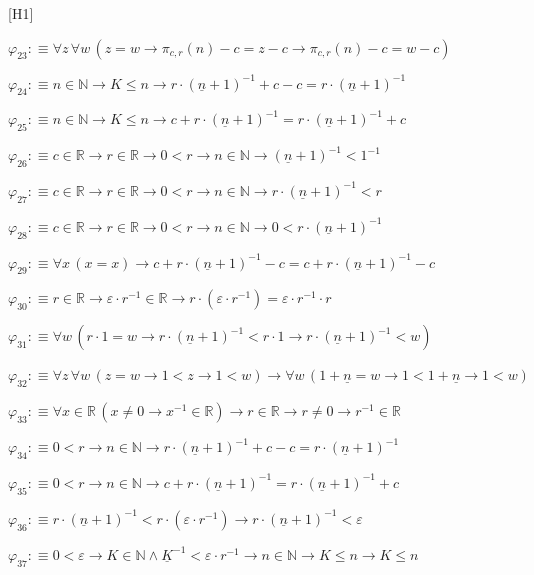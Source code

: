 \begin{fullproof}{[H1]}
\begin{abbrevlist}
\item $\varphi_{23} :\equiv \forall z\,\forall w\,(z = w \to \pi_{c,r}(n) - c = z - c \to \pi_{c,r}(n) - c = w - c)$
\item $\varphi_{24} :\equiv n \in \mathbb{N} \to K \leq n \to r \cdot (\underline{n} + 1)^{-1} + c - c = r \cdot (\underline{n} + 1)^{-1}$
\item $\varphi_{25} :\equiv n \in \mathbb{N} \to K \leq n \to c + r \cdot (\underline{n} + 1)^{-1} = r \cdot (\underline{n} + 1)^{-1} + c$
\item $\varphi_{26} :\equiv c \in \mathbb{R} \to r \in \mathbb{R} \to 0 < r \to n \in \mathbb{N} \to (\underline{n} + 1)^{-1} < 1^{-1}$
\item $\varphi_{27} :\equiv c \in \mathbb{R} \to r \in \mathbb{R} \to 0 < r \to n \in \mathbb{N} \to r \cdot (\underline{n} + 1)^{-1} < r$
\item $\varphi_{28} :\equiv c \in \mathbb{R} \to r \in \mathbb{R} \to 0 < r \to n \in \mathbb{N} \to 0 < r \cdot (\underline{n} + 1)^{-1}$
\item $\varphi_{29} :\equiv \forall x\,(x = x) \to c + r \cdot (\underline{n} + 1)^{-1} - c = c + r \cdot (\underline{n} + 1)^{-1} - c$
\item $\varphi_{30} :\equiv r \in \mathbb{R} \to \varepsilon \cdot r^{-1} \in \mathbb{R} \to r \cdot (\varepsilon \cdot r^{-1}) = \varepsilon \cdot r^{-1} \cdot r$
\item $\varphi_{31} :\equiv \forall w\,(r \cdot 1 = w \to r \cdot (\underline{n} + 1)^{-1} < r \cdot 1 \to r \cdot (\underline{n} + 1)^{-1} < w)$
\item $\varphi_{32} :\equiv \forall z\,\forall w\,(z = w \to 1 < z \to 1 < w) \to \forall w\,(1 + \underline{n} = w \to 1 < 1 + \underline{n} \to 1 < w)$
\item $\varphi_{33} :\equiv \forall x \in \mathbb{R}\,(x \neq 0 \to x^{-1} \in \mathbb{R}) \to r \in \mathbb{R} \to r \neq 0 \to r^{-1} \in \mathbb{R}$
\item $\varphi_{34} :\equiv 0 < r \to n \in \mathbb{N} \to r \cdot (\underline{n} + 1)^{-1} + c - c = r \cdot (\underline{n} + 1)^{-1}$
\item $\varphi_{35} :\equiv 0 < r \to n \in \mathbb{N} \to c + r \cdot (\underline{n} + 1)^{-1} = r \cdot (\underline{n} + 1)^{-1} + c$
\item $\varphi_{36} :\equiv r \cdot (\underline{n} + 1)^{-1} < r \cdot (\varepsilon \cdot r^{-1}) \to r \cdot (\underline{n} + 1)^{-1} < \varepsilon$
\item $\varphi_{37} :\equiv 0 < \varepsilon \to K \in \mathbb{N} \land \underline{K}^{-1} < \varepsilon \cdot r^{-1} \to n \in \mathbb{N} \to K \leq n \to K \leq n$

\end{abbrevlist}
\end{fullproof}
